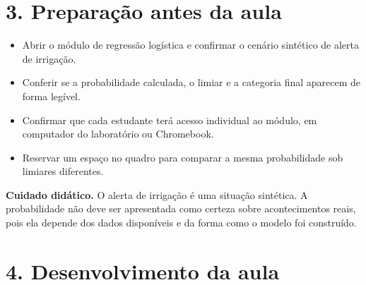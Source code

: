 \documentclass[12pt,a4paper]{article}
\newcommand{\bloco}[1]{%
  \vspace{0.25em}
  \noindent\colorbox{cinza}{\parbox{0.96\linewidth}{#1}}%
  \vspace{0.3em}
}
\begin{document}
\section*{3. Preparação antes da aula}

\begin{itemize}
  \item Abrir o módulo de regressão logística e confirmar o cenário sintético de alerta de irrigação.
  \item Conferir se a probabilidade calculada, o limiar e a categoria final aparecem de forma legível.
  \item Confirmar que cada estudante terá acesso individual ao módulo, em computador do laboratório ou Chromebook.
  \item Reservar um espaço no quadro para comparar a mesma probabilidade sob limiares diferentes.
\end{itemize}

\bloco{\textbf{Cuidado didático.} O alerta de irrigação é uma situação sintética. A probabilidade não deve ser apresentada como certeza sobre acontecimentos reais, pois ela depende dos dados disponíveis e da forma como o modelo foi construído.}

\section*{4. Desenvolvimento da aula}
\end{document}
